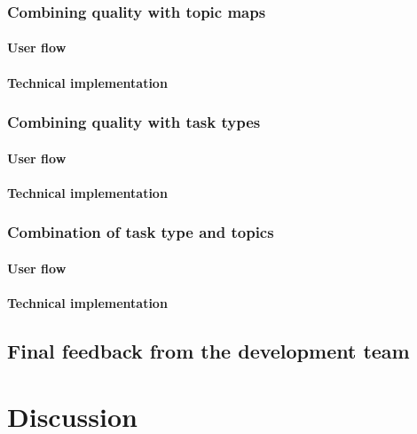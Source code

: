 \documentclass[
	english,
	ruledheaders=section,%
	class=report,%
	thesis={type=bachelor},%
	accentcolor=1b,%
	custommargins=true,%
	marginpar=false,%
	parskip=half-,%
	fontsize=11pt,%
	DIV=14,
]{tudapub}
\begin{document}
\subsection{Combining quality with topic maps}
\subsubsection{User flow}
\subsubsection{Technical implementation}
\subsection{Combining quality with task types}
\subsubsection{User flow}
\subsubsection{Technical implementation}
\subsection{Combination of task type and topics}
\subsubsection{User flow}
\subsubsection{Technical implementation}
\section{Final feedback from the development team}

\chapter{Discussion}

\end{document}
